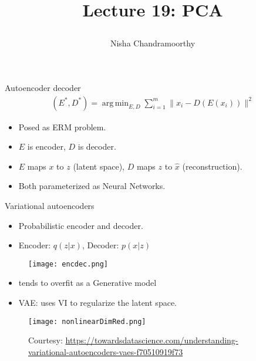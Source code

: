 \documentclass[final]{beamer}
\title{\begin{huge}{Lecture 19: PCA}\end{huge}} %
\author{Nisha Chandramoorthy} %
\DeclareMathOperator*{\argmin}{arg\,min}
\begin{document}
\frame{\titlepage}

\begin{frame}{Autoencoder decoder}
	\begin{align}
		(E^*, D^*) = \argmin_{E, D} \sum_{i=1}^m \|x_i - D(E(x_i))\|^2
	\end{align}
	\begin{itemize}
	\item Posed as ERM problem.
	\pause
	\item $E$ is encoder, $D$ is decoder. 
	\pause
\item $E$ maps $x$ to $z$ (latent space), $D$ maps $z$ to $\hat{x}$ (reconstruction).
	\pause
\item Both parameterized as Neural Networks.
	\end{itemize}
\end{frame}
\begin{frame}{Variational autoencoders}
	\begin{itemize}
	\item Probabilistic encoder and decoder.
	\pause
	\item Encoder: $q(z|x)$, Decoder: $p(x|z)$
	\end{itemize}

\end{frame}
\begin{frame}
	\begin{figure}
		\texttt{[image: encdec.png]}
	\end{figure}
	\begin{itemize}
		\item tends to overfit as a Generative model
		\pause
		\item VAE: uses VI to regularize the latent space.
	\end{itemize}
\end{frame}
\begin{frame}
\begin{figure}
	\texttt{[image: nonlinearDimRed.png]}
	\caption{Courtesy: \url{https://towardsdatascience.com/understanding-variational-autoencoders-vaes-f70510919f73}}
\end{figure}
\end{frame}
\end{document}
